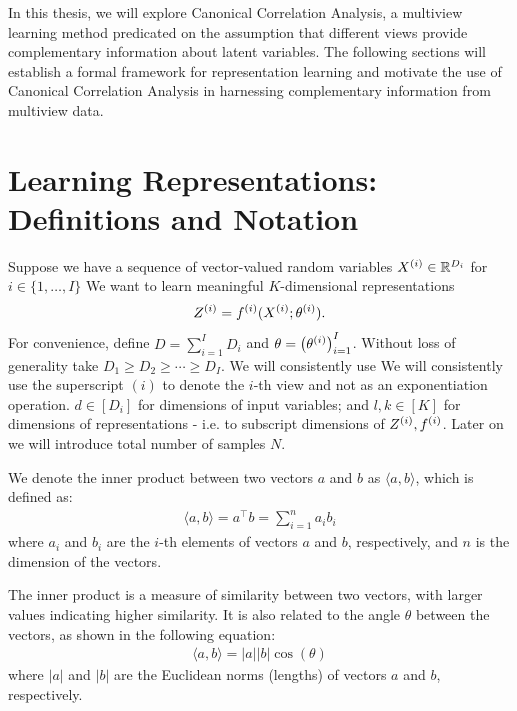 In this thesis, we will explore Canonical Correlation Analysis, a multiview learning method predicated on the assumption that different \gls{views} provide complementary information about latent variables. The following sections will establish a formal framework for representation learning and motivate the use of Canonical Correlation Analysis in harnessing complementary information from multiview data.

\section{Learning Representations: Definitions and Notation}

Suppose we have a sequence of vector-valued random variables $X^{(i)} \in \mathbb{R}^{D_i}$ for $i \in \{1, \dots, I \}$
We want to learn meaningful $K$-dimensional \gls{representations}
\begin{equation}
    \label{eq:general-form-of-representations}
    Z^{(i)} = f^{(i)}( X^{(i)}; \theta^{(i)}).
\end{equation}
For convenience, define $D = \sum_{i=1}^I D_i$ and $\theta = \left(\theta^{(i)}\right)_{i=1}^I$.
Without loss of generality take $D_1 \geq D_2 \geq \cdots \geq D_I$.
We will consistently use We will consistently use the superscript $(i)$ to denote the $i$-th view and not as an exponentiation operation.
$d \in [D_i]$ for dimensions of input variables;
and $l,k \in [K]$ for dimensions of \gls{representations} - i.e. to subscript dimensions of $Z^{(i)}, f^{(i)}$.
Later on we will introduce total number of samples $N$.

We denote the inner product between two vectors $a$ and $b$ as $\langle a, b \rangle$, which is defined as:
\begin{align}
\label{eq:inner-product}
\langle a, b \rangle = a^\top b = \sum_{i=1}^n a_i b_i
\end{align}
where $a_i$ and $b_i$ are the $i$-th elements of vectors $a$ and $b$, respectively, and $n$ is the dimension of the vectors.

The inner product is a measure of similarity between two vectors, with larger values indicating higher similarity. It is also related to the angle $\theta$ between the vectors, as shown in the following equation:
\begin{align}
\label{eq:inner-product-angle}
\langle a, b \rangle = |a| |b| \cos(\theta)
\end{align}
where $|a|$ and $|b|$ are the Euclidean norms (lengths) of vectors $a$ and $b$, respectively.

